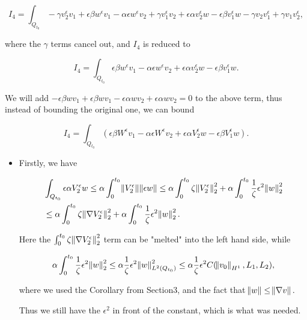 \documentclass[11pt]{article}
\begin{document}
\begin{enumerate}
    $$ I_4 = \int_{Q_{t_0}}  - \gamma v_2^\epsilon v_1 + \epsilon \beta w^\epsilon v_1 - \alpha \epsilon w^\epsilon v_2 + \gamma v_1^\epsilon v_2 + \epsilon \alpha v^\epsilon_2 w - \epsilon \beta v^\epsilon_1 w - \gamma v_2 v_1^\epsilon + \gamma v_1 v_2^\epsilon,$$
    
    where the $\gamma$ terms cancel out, and $I_4$ is reduced to
    
    $$ I_4 = \int_{Q_{t_0}}  \epsilon \beta w^\epsilon v_1 - \alpha \epsilon w^\epsilon v_2 + \epsilon \alpha v^\epsilon_2 w - \epsilon \beta v^\epsilon_1 w.$$
    
    We will add $ - \epsilon \beta w v_1 +  \epsilon \beta w v_1 - \epsilon \alpha w v_2 + \epsilon \alpha w v_2 = 0 $ to the above term, thus instead of bounding the original one, we can bound

    $$ I_4 = \int_{Q_{t_0}}  ( \epsilon \beta W^\epsilon v_1 - \alpha \epsilon W^\epsilon v_2 + \epsilon \alpha V^\epsilon_2 w - \epsilon \beta V^\epsilon_1 w).$$
    
    \begin{itemize}
    
      \item Firstly, we have
      
      \begin{equation}
        \begin{split}
          & \int_{Q_{t_0}} \epsilon \alpha V^\epsilon_2 w \leq \alpha \int_0^{t_0} \norm{V^\epsilon_2} \norm{\epsilon w}  \leq \alpha \int_0^{t_0} \zeta \norm{V^\epsilon_2}^2_2 + \alpha \int_0^{t_0} \frac{1}{\zeta} \epsilon^2 \norm{ w}^2_2 \\
          & \leq \alpha \int_0^{t_0} \zeta \norm{\nabla V^\epsilon_2}^2_2 + \alpha \int_0^{t_0} \frac{1}{\zeta} \epsilon^2 \norm{ w}^2_2.
        \end{split}
      \end{equation}
      
      Here the $\int_0^{t_0} \zeta \norm{\nabla V^\epsilon_2}^2_2$  term can be "melted" into the left hand side, while
      
      $$\alpha \int_0^{t_0} \frac{1}{\zeta} \epsilon^2 \norm{w}^2_2 \leq \alpha \frac{1}{\zeta} \epsilon^2 \norm{w}^2_{L^2(Q_{t_0})} \leq \alpha \frac{1}{\zeta} \epsilon^2 C(\norm{v_0}_{H^1}, L_1, L_2),$$
      
      where we used the Corollary from Section3, and the fact that $\norm{w} \leq \norm{\nabla v}.$
      
      Thus we still have the $\epsilon^2$ in front of the constant, which is what was needed.
      

\end{itemize}
\end{enumerate}
\end{document}
